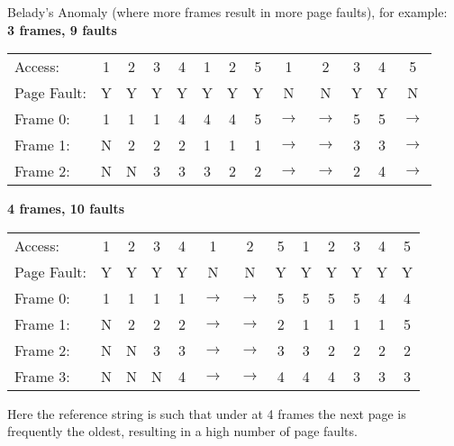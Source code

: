 \documentclass{report}
\begin{document}
Belady's Anomaly (where more frames result in more page faults), for example:
\\ \textbf{3 frames, 9 faults}
\begin{center}
	\begin{tabular}{l c c c c c c c c c c c c}
		Access:     & 1 & 2 & 3 & 4 & 1 & 2 & 5 & 1     & 2     & 3 & 4 & 5     \\
		Page Fault: & Y & Y & Y & Y & Y & Y & Y & N     & N     & Y & Y & N     \\
		Frame 0:    & 1 & 1 & 1 & 4 & 4 & 4 & 5 & $\to$ & $\to$ & 5 & 5 & $\to$ \\
		Frame 1:    & N & 2 & 2 & 2 & 1 & 1 & 1 & $\to$ & $\to$ & 3 & 3 & $\to$ \\
		Frame 2:    & N & N & 3 & 3 & 3 & 2 & 2 & $\to$ & $\to$ & 2 & 4 & $\to$ \\
	\end{tabular}
\end{center}
\textbf{4 frames, 10 faults}
\begin{center}
	\begin{tabular}{l c c c c c c c c c c c c}
		Access:     & 1 & 2 & 3 & 4 & 1     & 2     & 5 & 1 & 2 & 3 & 4 & 5 \\
		Page Fault: & Y & Y & Y & Y & N     & N     & Y & Y & Y & Y & Y & Y \\
		Frame 0:    & 1 & 1 & 1 & 1 & $\to$ & $\to$ & 5 & 5 & 5 & 5 & 4 & 4 \\
		Frame 1:    & N & 2 & 2 & 2 & $\to$ & $\to$ & 2 & 1 & 1 & 1 & 1 & 5 \\
		Frame 2:    & N & N & 3 & 3 & $\to$ & $\to$ & 3 & 3 & 2 & 2 & 2 & 2 \\
		Frame 3:    & N & N & N & 4 & $\to$ & $\to$ & 4 & 4 & 4 & 3 & 3 & 3 \\
	\end{tabular}
\end{center}
Here the reference string is such that under  at 4 frames the next page is frequently the oldest, resulting in a high number of page faults.
\end{document}
